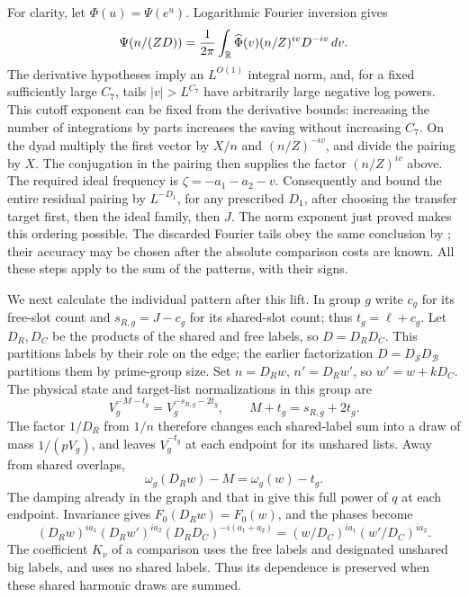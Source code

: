For clarity, let $\Phi(u)=\Psi(e^u)$. Logarithmic Fourier inversion gives
\[
 \Psi(n/(ZD))=\frac1{2\pi}\int_{\mathbb R}
       \widehat\Phi(v)(n/Z)^{iv}D^{-iv}\,dv.
\]
The derivative hypotheses imply an $L^{O(1)}$ integral norm, and, for a
fixed sufficiently large $C_7$, tails $|v|>L^{C_7}$ have arbitrarily
large negative log powers. This cutoff exponent can be fixed from the
derivative bounds: increasing the number of integrations by parts
increases the saving without increasing $C_7$.
On the dyad multiply the first vector by $X/n$ and $(n/Z)^{-iv}$,
and divide the pairing by $X$. The conjugation in the pairing then
supplies the factor $(n/Z)^{iv}$ above. The required ideal frequency is
$\zeta=-a_1-a_2-v$. Consequently 
and  bound the entire residual pairing by $L^{-D_1}$,
for any prescribed $D_1$, after choosing the transfer target first,
then the ideal family, then $J$. The norm exponent just proved makes
this ordering possible. The discarded Fourier tails obey the same
conclusion by ; their accuracy may be chosen
after the absolute comparison costs are known. All these steps apply
to the sum of the patterns, with their signs.

We next calculate the individual pattern after this lift. In group $g$
write $c_g$ for its free-slot count and $s_{R,g}=J-c_g$ for its
shared-slot count; thus $t_g=\ell+c_g$. Let $D_R,D_C$ be the products
of the shared and free labels, so $D=D_RD_C$. This partitions labels
by their role on the edge; the earlier factorization
$D=D_{\mathcal S}D_{\mathcal B}$ partitions them by prime-group size.
Set
$n=D_Rw$, $n'=D_Rw'$, so $w'=w+kD_C$.
The physical state and target-list normalizations in this group are
\[
 V_g^{-M-t_g}=V_g^{-s_{R,g}-2t_g},
 \qquad M+t_g=s_{R,g}+2t_g.
\]
The factor $1/D_R$ from $1/n$ therefore changes each shared-label
sum into a draw of mass $1/(pV_g)$, and leaves $V_g^{-t_g}$ at each
endpoint for its unshared lists. Away from shared overlaps,
\[
 \omega_g(D_Rw)-M=\omega_g(w)-t_g.
\]
The damping already in the graph and that in 
give this full power of $q$ at each endpoint. Invariance gives
$F_0(D_Rw)=F_0(w)$, and the phases become
\[
 (D_Rw)^{ia_1}(D_Rw')^{ia_2}(D_RD_C)^{-i(a_1+a_2)}
       =(w/D_C)^{ia_1}(w'/D_C)^{ia_2}.
\]
The coefficient $K_\nu$ of a comparison uses the free labels and
designated unshared big labels, and uses no shared labels. Thus its
dependence is preserved when these shared harmonic draws are summed.

